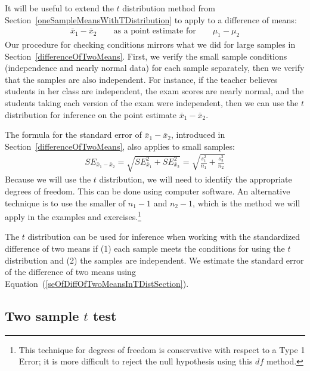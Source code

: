 It will be useful to extend the $t$ distribution method from Section~\ref{oneSampleMeansWithTDistribution} to apply to a difference of means:
\begin{eqnarray*}
\bar{x}_1 - \bar{x}_2
	\qquad \text{as a point estimate for} \qquad
	\mu_1 - \mu_2
\end{eqnarray*}
Our procedure for checking conditions mirrors what we did for large samples in Section~\ref{differenceOfTwoMeans}. First, we verify the small sample conditions (independence and nearly normal data) for each sample separately, then we verify that the samples are also independent. For instance, if the teacher believes students in her class are independent, the exam scores are nearly normal, and the students taking each version of the exam were independent, then we can use the $t$ distribution for inference on the point estimate $\bar{x}_{1} - \bar{x}_{2}$.

The formula for the standard error of $\bar{x}_{1} - \bar{x}_{2}$, introduced in Section~\ref{differenceOfTwoMeans},
also applies to small samples:
\begin{eqnarray}
SE_{\bar{x}_1 - \bar{x}_2}
	= \sqrt{SE_{\bar{x}_1}^2 + SE_{\bar{x}_2}^2}
	 = \sqrt{\frac{s_1^2}{n_1} + \frac{s_2^2}{n_2}} \label{seOfDiffOfTwoMeansInTDistSection}
\end{eqnarray}
Because we will use the $t$ distribution, we will need to identify the appropriate degrees of freedom. This can be done using computer software. An alternative technique is to use the smaller of $n_1 - 1$ and $n_2 - 1$, which is the method we will apply in the examples and exercises.\footnote{This technique for degrees of freedom is conservative with respect to a Type 1 Error; it is more difficult to reject the null hypothesis using this $df$ method.}

\begin{termBox}{
The $t$ distribution can be used for inference when working with the standardized difference of two means if (1) each sample meets the conditions for using the $t$ distribution and (2) the samples are independent. We estimate the standard error of the difference of two means using Equation~(\ref{seOfDiffOfTwoMeansInTDistSection}).}
\end{termBox}

\subsection{Two sample $t$ test}

